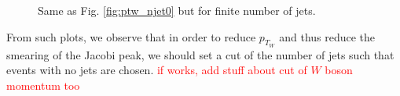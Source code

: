 \documentclass[a4paper]{report}
\numberwithin{equation}{section}
\begin{document}
\begin{figure}[htb!]
	\centering
	\quad
	\centering
	\quad
    \centering
	\quad
    \centering
	\quad
	\caption{Same as Fig. \ref{fig:ptw_njet0} but for finite number of jets. }
	\label{fig:ptw_njets}
\end{figure}

From such plots, we observe that in order to reduce $p_{T_W}$ and thus reduce the smearing of the Jacobi peak,
 we should set a cut of the number of jets such that events with no jets are chosen. \textcolor{red}{if works, add 
 stuff about cut of $W$ boson momentum too}
 
\end{document}

